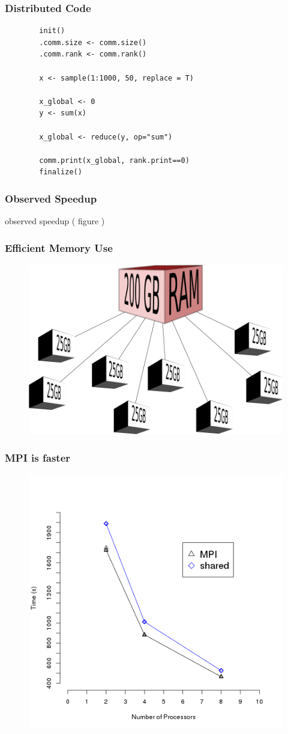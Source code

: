 \begin{frame}[fragile]
		\frametitle{Distributed Code}
		\begin{verbatim}
		init()
		.comm.size <- comm.size()
		.comm.rank <- comm.rank()

		x <- sample(1:1000, 50, replace = T)

		x_global <- 0
		y <- sum(x)

		x_global <- reduce(y, op="sum")

		comm.print(x_global, rank.print==0)
		finalize()
		\end{verbatim}
\end{frame}

\begin{frame}
		\frametitle{Observed Speedup}
		observed speedup ( figure )
\end{frame}

\begin{frame}
		\frametitle{Efficient Memory Use}
		\begin{figure}
				\includegraphics[width=0.8\linewidth]{figures/diagrams/splitmem/memsplit}
		\end{figure}
\end{frame}

\begin{frame}
		\frametitle{MPI is faster}
		\begin{figure}
				\includegraphics[width=0.65\linewidth]{figures/diagrams/comparison/comparison}
		\end{figure}
\end{frame}

